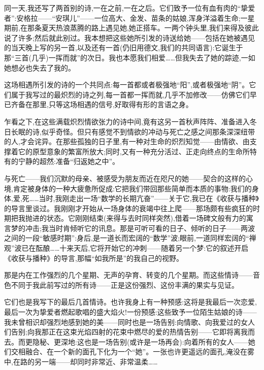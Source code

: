 同一天,我还写了两首别的诗,一在之前,一在之后。它们致予一位有血有肉的“挚爱者”:安格拉——“安琪儿”——一位高大、金发、苗条的姑娘,浑身洋溢着生命;一星期前,在那条夏天热浪蒸腾的路上遇见她,她正搭车。一两个钟头里,我们来得及彼此说了许多;然后就此别过。我本想把这些她所引发的诗送给她——包括在她被遇见的当天晚上写的另一首,以及还有一首(仍旧用德文,我们的共同语言):它诞生于那“三首(几乎)一挥而就”的次日。我也本愿我们相爱……但我失去了她的踪迹,一如她想必也失去了我的。

这场相遇所引发的诗的一个共同点:每一首都或者极强地“阳”,或者极强地“阴”。它们属于我写过的最炽烈的诗之列,每一首都一挥而就,几乎不加修改——仿佛它们早已齐备在那里,只等这场相遇的信号,好取得有形的言语之身。

乍看之下,在这些满载炽烈情欲张力的诗中间,竟有这另一首秋声阵阵、准备进入冬日长眠的诗,似乎奇怪。但只有感觉不到情欲的冲动与死亡之感之间那条深深纽带的人,才会诧异。在那些孤独的日子里,有一种对生命的炽烈知觉——由情欲、由支撑着它的原型意象的繁富所放大;同时,又有一种充分活过、正走向终点的生命所特有的宁静的超然:准备“归返她之中”。

与死亡——我们沉默的母亲、被感受为朋友而近在咫尺的她——契合的这样的心境,肯定被身体的一种大疲惫所促成:它把我们带回那些简单而本质的事物:我们的身体,爱,死……当时,我刚走出一场“数学的长期亢奋”——关于它,我已在《收获与播种》的导言里谈过\dmark{}。我刚刚才开始从一场身体的衰竭中往上爬——那场颇有些疯狂的时期把我抛进的状态。它刚刚结束(来得与去时同样突然),借着一场碑文般有力的寓言梦的冲击;我当时肯倾听它的讯息。那是可听可看的日子、倾听的日子——两波之间的一段“敏感时期”:身后,是一道长而宏阔的“数学”波;眼前,一道同样宏阔的“禅观”波已在酝酿……十来天后,它将开始它的冲刺——随着另一个梦:它的叙述开启《收获与播种》的导言,那幅“如我所是”的我自己的视野。

那是内在工作强烈的几个星期、无声的孕育、转变的几个星期。而这些情诗——音色不同于我此前写过的所有诗——正是这份强烈、这份丰满的果实与见证。

它们也是我写下的最后几首情诗。也许我身上有一种预感:这将是我最后一次恋爱,最后一次为挚爱者燃起歌唱的盛大焰火!一份预感:这些致予一位陌生姑娘的诗——我未曾相识却强烈地感到她的美——同时也是一场告别:向情歌、向我爱过的女人们告别;向我那正在这束光焰四射的花束中燃尽的爱的热情告别——它即将离我而去。而更隐秘、更深地:这也是一场告别(或许是一场再会):向着所有的女人——她们交相融合、在一个新的面孔下化为一个“她”。一张也许更遥远的面孔,淹没在雾中,在路的另一端——却同时非常近、非常温柔……

